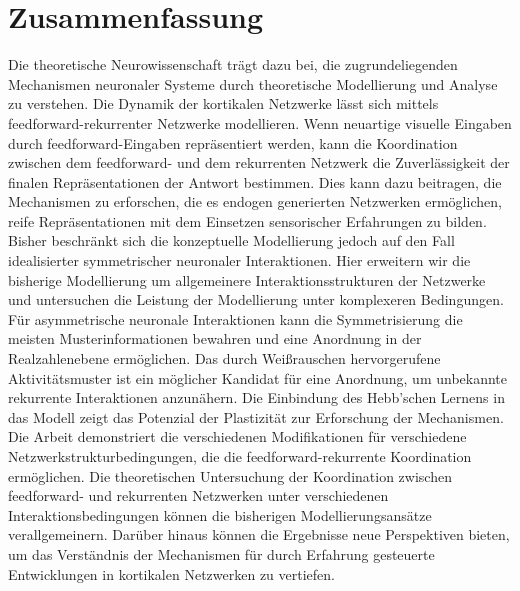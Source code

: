 \documentclass[11pt]{article}
\begin{document}
	
	\section*{Zusammenfassung}
	
	Die theoretische Neurowissenschaft trägt dazu bei, die zugrundeliegenden Mechanismen neuronaler Systeme durch theoretische Modellierung und Analyse zu verstehen. Die Dynamik der kortikalen Netzwerke lässt sich mittels feedforward-rekurrenter Netzwerke modellieren. Wenn neuartige visuelle Eingaben durch feedforward-Eingaben repräsentiert werden, kann die Koordination zwischen dem feedforward- und dem rekurrenten Netzwerk die Zuverlässigkeit der finalen Repräsentationen der Antwort bestimmen. Dies kann dazu beitragen, die Mechanismen zu erforschen, die es endogen generierten Netzwerken ermöglichen, reife Repräsentationen mit dem Einsetzen sensorischer Erfahrungen zu bilden. Bisher beschränkt sich die konzeptuelle Modellierung jedoch auf den Fall idealisierter symmetrischer neuronaler Interaktionen. Hier erweitern wir die bisherige Modellierung um allgemeinere Interaktionsstrukturen der Netzwerke und untersuchen die Leistung der Modellierung unter komplexeren Bedingungen.
	Für asymmetrische neuronale Interaktionen kann die Symmetrisierung die meisten Musterinformationen bewahren und eine Anordnung in der Realzahlenebene ermöglichen. Das durch Weißrauschen hervorgerufene Aktivitätsmuster ist ein möglicher Kandidat für eine Anordnung, um unbekannte rekurrente Interaktionen anzunähern. Die Einbindung des Hebb'schen Lernens in das Modell zeigt das Potenzial der Plastizität zur Erforschung der Mechanismen. Die Arbeit demonstriert die verschiedenen Modifikationen für verschiedene Netzwerkstrukturbedingungen, die die feedforward-rekurrente Koordination ermöglichen.
	Die theoretischen Untersuchung der Koordination zwischen feedforward- und rekurrenten Netzwerken unter verschiedenen Interaktionsbedingungen können die bisherigen Modellierungsansätze verallgemeinern. Darüber hinaus können die Ergebnisse neue Perspektiven bieten, um das Verständnis der Mechanismen für durch Erfahrung gesteuerte Entwicklungen in kortikalen Netzwerken zu vertiefen.
	
\end{document}
